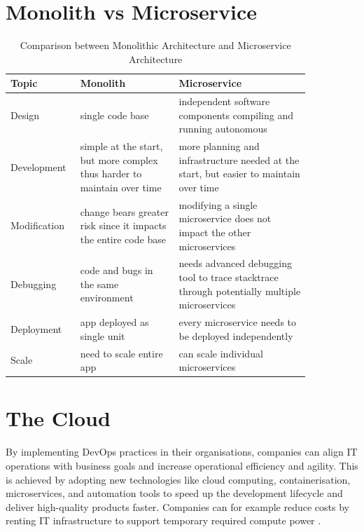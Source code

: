 \documentclass[BIF,Bachelor,nenglish]{twbook}%
\begin{document}
\section{Monolith vs Microservice} \label{movsmi}
\begin{table}[!h]
    \centering
    \begin{tabular}{|p{0.15\linewidth}|p{0.3\linewidth}|p{0.4\linewidth}|}
    \hline
        \textbf{Topic} & \textbf{Monolith} & \textbf{Microservice} \\ \hline
        Design & single code base & independent software components compiling and running autonomous \\ \hline
        Development & simple at the start, but more complex thus harder to maintain over time & more planning and infrastructure needed at the start, but easier to maintain over time \\ \hline
        Modification & change bears greater risk since it impacts the entire code base & modifying a single microservice does not impact the other microservices \\ \hline
        Debugging & code and bugs in the same environment & needs advanced debugging tool to trace stacktrace through potentially multiple microservices \\ \hline
        Deployment & app deployed as single unit & every microservice needs to be deployed independently \\ \hline
        Scale & need to scale entire app & can scale individual microservices \\ \hline
    \end{tabular}
    \caption{Comparison between Monolithic Architecture and Microservice Architecture}
\end{table}

\section{The Cloud}
By implementing DevOps practices in their organisations, companies can align IT operations with business goals and increase operational efficiency and agility. This is achieved by adopting new technologies like cloud computing, containerisation, microservices, and automation tools to speed up the development lifecycle and deliver high-quality products faster. Companies can for example reduce costs by renting IT infrastructure to support temporary required compute power \cite{qia2009}.
\end{document}
